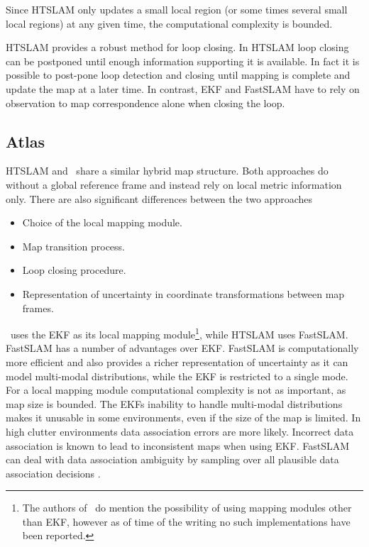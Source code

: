 Since HTSLAM only updates a small local region (or some times
several small local regions) at any given time, the computational
complexity is bounded.

HTSLAM provides a robust method for loop closing. In HTSLAM loop
closing can be postponed until enough information supporting it is
available. In fact it is possible to post-pone loop detection and
closing until mapping is complete and update the map at a later time. In
contrast, EKF and FastSLAM have to rely on observation to map
correspondence alone when closing the loop.


\subsection{Atlas}

HTSLAM and \Atlas\ share a similar hybrid map structure. Both approaches
do without a global reference frame and instead rely on local metric
information only. There are also significant differences between the
two approaches

\begin{itemize}
\item Choice of the local mapping module.
\item Map transition process.
\item Loop closing procedure.
\item Representation of uncertainty in coordinate transformations
  between map frames.
\end{itemize}

\Atlas\ uses the EKF as its local mapping module\footnote{The authors
  of \Atlas\ do mention the possibility of using mapping modules other
  than EKF, however as of time of the writing no such implementations
  have been reported.}, while HTSLAM uses FastSLAM. FastSLAM has a
number of advantages over EKF. FastSLAM is computationally more
efficient and also provides a richer representation of uncertainty as
it can model multi-modal distributions, while the EKF is restricted to
a single mode. For a local mapping module computational complexity is
not as important, as map size is bounded. The EKFs inability to handle
multi-modal distributions makes it unusable in some environments, even
if the size of the map is limited.  In high clutter environments data
association errors are more likely. Incorrect data association is
known to lead to inconsistent maps when using EKF. FastSLAM can deal
with data association ambiguity by sampling over all plausible data
association decisions \cite{fastslam,Montemerlo2003,nieto2003}.

